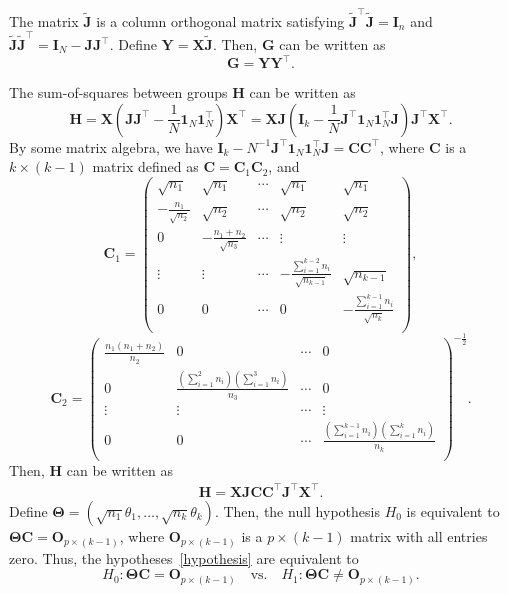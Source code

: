 \documentclass[12pt]{article} %
\newcommand{\bX}{\mathbf{X}}
\newcommand{\bY}{\mathbf{Y}}
\newcommand{\bH}{\mathbf{H}}
\newcommand{\bG}{\mathbf{G}}
\newcommand{\bJ}{\mathbf{J}}
\newcommand{\bC}{\mathbf{C}}
\newcommand{\bO}{\mathbf{O}}
\newcommand{\bI}{\mathbf{I}}
\newcommand{\bfsym}[1]{\ensuremath{\boldsymbol{#1}}}
\def\bTheta {\bfsym {\Theta}}
\theoremstyle{definition}
\begin{document}
The matrix $\tilde{\bJ}$ is a column orthogonal matrix  satisfying $\tilde{\bJ}^\top\tilde{\bJ}=\bI_{n}$ and $\tilde{\bJ}\tilde{\bJ}^\top =\bI_N-\bJ\bJ^\top$.
Define $\bY=\bX\tilde{\bJ}$.
Then, $\bG$ can be written as
$$\bG=
\bY \bY^\top.
$$

The sum-of-squares between groups $\bH$ can be written as
$$
        \bH=\bX(\bJ\bJ^\top-\frac{1}{N}\mathbf{1}_N\mathbf{1}_N^\top)\bX^\top
=\bX \bJ(\bI_k-\frac{1}{N}\bJ^\top\mathbf{1}_N \mathbf{1}_N^\top \bJ)\bJ^\top \bX^\top.
$$
By some matrix algebra, we have $\bI_k-N^{-1}\bJ^\top\mathbf{1}_N \mathbf{1}_N^\top \bJ=\bC\bC^\top$,
where $\bC$ is a $k\times (k-1)$ matrix defined as $\bC=\bC_1\bC_2$, and
 $$
\bC_1=\begin{pmatrix}
    \sqrt{n_1}&\sqrt{n_1}&\cdots&\sqrt{n_1}&\sqrt{n_1}\\
    -\frac{n_1}{\sqrt{n_2}}&\sqrt{n_2}&\cdots&\sqrt{n_2}&\sqrt{n_2}\\
    0&-\frac{n_1+n_2}{\sqrt{n_3}}&\cdots&\vdots&\vdots\\
    \vdots&\vdots&\cdots&-\frac{\sum_{i=1}^{k-2}n_i}{\sqrt{n_{k-1}}}&\sqrt{n_{k-1}}\\
    0&0&\cdots&0&-\frac{\sum_{i=1}^{k-1}n_i}{\sqrt{n_k}}\\
\end{pmatrix},
 $$
 $$
\bC_2=\begin{pmatrix}
    \frac{n_1(n_1+n_2)}{n_2}&0&\cdots&0\\
    0&\frac{(\sum_{i=1}^2 n_i)(\sum_{i=1}^3 n_i)}{n_3}&\cdots&0\\
    \vdots&\vdots&\cdots&\vdots\\
    0&0&\cdots&\frac{(\sum_{i=1}^{k-1} n_i)(\sum_{i=1}^k n_i)}{n_{k}}\\
\end{pmatrix}^{-\frac{1}{2}}.
$$
Then, $\bH$ can be written as
\begin{equation*}
    \begin{aligned}
        \bH=\bX \bJ\bC \bC^\top \bJ^\top \bX^\top.
    \end{aligned}
\end{equation*}
Define $\bTheta=(\sqrt{n_1}\theta_1,\ldots,\sqrt{n_k}\theta_k)$.
Then, the null hypothesis $H_0$ is equivalent to $\bTheta \bC=\bO_{p\times (k-1)}$, where $\bO_{p\times (k-1)}$ is a $p\times (k-1)$ matrix with all entries zero.
 Thus, the hypotheses~\eqref{hypothesis} are equivalent to
 $$
 H_0:\bTheta \bC=\bO_{p\times (k-1)}\quad \text{vs.}\quad H_1: \bTheta \bC\neq \bO_{p\times (k-1)}.
 $$
\end{document}
